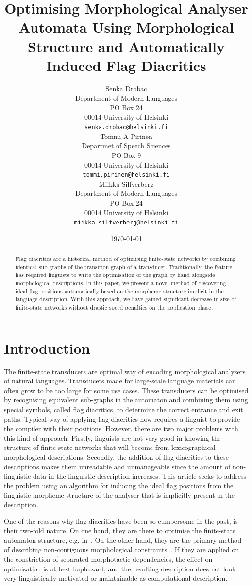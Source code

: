 \documentclass[11pt]{article}
\title{Optimising Morphological Analyser Automata Using Morphological Structure
and Automatically Induced Flag Diacritics}
\author{Senka Drobac \\
Department of Modern Languages \\
PO Box 24 \\
00014 University of Helsinki \\
  {\tt senka.drobac@helsinki.fi} \\\And
  Tommi A Pirinen \\
Departmet of Speech Sciences\\
PO Box 9\\
00014 University of Helsinki\\
  {\tt tommi.pirinen@helsinki.fi} \\\And
  Miikka Silfverberg \\
  Department of Modern Languages \\
	PO Box 24 \\
	00014 University of Helsinki \\
	{\tt miikka.silfverberg@helsinki.fi} \\}
\date{\today}
\begin{document}
\maketitle
\begin{abstract}
    Flag diacritics are a historical method of optimising finite-state networks
    by combining identical sub graphs of the transition graph of a transducer. Traditionally, the
    feature has required linguists to write the optimisation of the graph by
    hand alongside morphological descriptions. In this paper, we present a novel
    method of discovering ideal flag positions automatically based on the
    morpheme structure implicit in the language description. With this
    approach, we have gained significant decrease in size of finite-state networks
    without drastic speed penalties on the application phase.
\end{abstract}

\section{Introduction}

The finite-state transducers are optimal way of encoding morphological analysers
of natural languages. Transducers made for large-scale language materials can
often grow to be too large for some use cases. These transducers can be optimised
by recognising equivalent sub-graphs in the automaton and combining them using
special symbols, called flag diacritics, to determine the correct entrance and
exit paths. Typical way of applying flag diacritics now requires a linguist to
provide the compiler with their positions. However, there are two
major problems with this kind of approach: Firstly, linguists are not very good
in knowing the structure of finite-state networks that will become from
lexicographical-morphological descriptions; Secondly, the addition of flag
diacritics to these descriptions makes them unreadable and unmanageable since
the amount of non-linguistic data in the linguistic description increases. This
article seeks to address the problem using an algorithm for inducing the ideal
flag positions from the linguistic morpheme structure of the analyser that is
implicitly present in the description. 

One of the reasons why flag diacritics have been so cumbersome in the past,
is their two-fold nature. On one hand, they are there to optimise the
finite-state automaton structure, e.g. in~\cite{karttunen2006numbers}. On the
other hand, they are the primary method of describing non-contiguous 
morphological constraints~\cite{beesley1998constraining}. If they are applied
on the constriction of separated morphotactic dependencies, the effect on
optimisation is at best haphazard, and the resulting description does not
look very linguistically motivated or maintainable as computational description.
\end{document}
